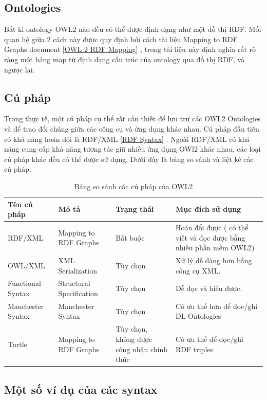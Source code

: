 \subsection{Ontologies}
Bất kì ontology OWL2 nào đều có thể được định dạng như một đồ thị RDF. Mối quan hệ giữa 2 cách này được quy định bới cách tài liệu Mapping to RDF Graphs document [\href{http://www.w3.org/TR/owl2-overview/#ref-owl-2-rdf-mapping}{OWL 2 RDF Mapping}] \cite{mapping_rdf_graph}, trong tài liệu này định nghĩa rất rõ ràng một bảng map từ định dạng cấu trúc của ontology qua đồ thị RDF, và ngược lại. 
\subsection{Cú pháp}
Trong thực tế, một cú pháp cụ thể rất cần thiết để lưu trữ các OWL2 Ontologies và để trao đổi chúng giữa các công cụ và ứng dụng khác nhau. Cú pháp đầu tiên có khả năng hoán đổi là RDF/XML [\href{http://www.w3.org/TR/owl2-overview/#ref-rdf-syntax}{RDF Syntax}] \cite{rdfxml}. Ngoài RDF/XML có khả năng cung cấp khả năng tương tác giữ nhiều ứng dụng OWl2 khác nhau, các loại cú pháp khác đều có thể được sử dụng. Dưới đây là bảng so sánh và liệt kê các cú pháp.
\begin{table}[!h]
\begin{tabular}{ |p{3cm}|p{4cm}|p{3cm}|p{4cm}|}
\hline
Tên cú pháp & Mô tả & Trạng thái & Mục đích sử dụng\\
\hline
RDF/XML & Mapping to RDF Graphs \cite{mapping_rdf_graph} \cite{rdfxml} & Bắt buộc & Hoán đổi được ( có thể viết và đọc được bằng nhiều phần mềm OWL2)
\\
\hline
OWL/XML & XML Serialization \cite{owlxml} & Tùy chọn & Xử lý dễ dàng hơn bằng công cụ XML.
\\
\hline
Functional Syntax & Structural Specification \cite{func_syntax} & Tùy chọn & Dễ đọc và hiểu được.
\\
\hline
Manchester Syntax & Manchester Syntax \cite{man_syntax} & Tùy chọn & Có ưu thế hơn để đọc/ghi DL Ontologies
\\
\hline
Turtle & Mapping to RDF Graphs \cite{mapping_rdf_graph} & Tùy chọn, không được công nhận chính thức & Có ưu thế để đọc/ghi RDF triples
\\
\hline
\end{tabular}
\caption{Bảng so sánh các cú pháp của OWL2\label{overflow}}
\end{table}
\subsection{Một số ví dụ của các syntax}

